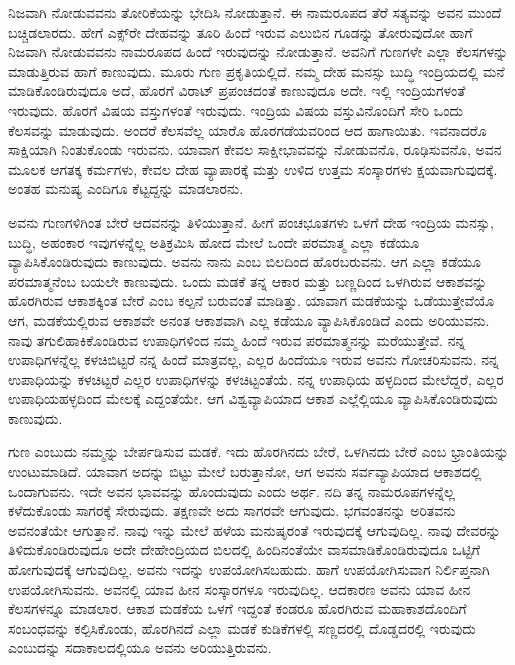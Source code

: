 ನಿಜವಾಗಿ ನೋಡುವವನು ತೋರಿಕೆಯನ್ನು ಭೇದಿಸಿ ನೋಡುತ್ತಾನೆ. ಈ ನಾಮರೂಪದ ತೆರೆ ಸತ್ಯವನ್ನು ಅವನ ಮುಂದೆ ಬಚ್ಚಿಡಲಾರದು. ಹೇಗೆ ಎಕ್ಸ್​ರೇ ದೇಹವನ್ನು ತೂರಿ ಹಿಂದೆ ಇರುವ ಎಲುಬಿನ ಗೂಡನ್ನು ತೋರುವುದೋ ಹಾಗೆ ನಿಜವಾಗಿ ನೋಡುವವನು ನಾಮರೂಪದ ಹಿಂದೆ ಇರುವುದನ್ನು ನೋಡುತ್ತಾನೆ. ಅವನಿಗೆ ಗುಣಗಳೇ ಎಲ್ಲಾ ಕೆಲಸಗಳನ್ನು ಮಾಡುತ್ತಿರುವ ಹಾಗೆ ಕಾಣುವುದು. ಮೂರು ಗುಣ ಪ್ರಕೃತಿಯಲ್ಲಿದೆ. ನಮ್ಮ ದೇಹ ಮನಸ್ಸು ಬುದ್ಧಿ ಇಂದ್ರಿಯದಲ್ಲಿ ಮನೆ ಮಾಡಿಕೊಂಡಿರುವುದೂ ಅದೆ, ಹೊರಗೆ ವಿರಾಟ್ ಪ್ರಪಂಚದಂತೆ ಕಾಣುವುದೂ ಅದೇ. ಇಲ್ಲಿ ಇಂದ್ರಿಯಗಳಂತೆ ಇರುವುದು. ಹೊರಗೆ ವಿಷಯ ವಸ್ತುಗಳಂತೆ ಇರುವುದು. ಇಂದ್ರಿಯ ವಿಷಯ ವಸ್ತುವಿನೊಂದಿಗೆ ಸೇರಿ ಒಂದು ಕೆಲಸವನ್ನು ಮಾಡುವುದು. ಅಂದರೆ ಕೆಲಸವೆಲ್ಲ ಯಾರೊ ಹೊರಗಡೆಯವರಿಂದ ಆದ ಹಾಗಾಯಿತು. ಇವನಾದರೊ ಸಾಕ್ಷಿಯಾಗಿ ನಿಂತುಕೊಂಡು ಇರುವನು. ಯಾವಾಗ ಕೇವಲ ಸಾಕ್ಷೀಭಾವವನ್ನು ನೋಡುವನೊ, ರೂಢಿಸುವನೊ, ಅವನ ಮೂಲಕ ಆಗತಕ್ಕ ಕರ್ಮಗಳು, ಕೇವಲ ದೇಹ ವ್ಯಾಪಾರಕ್ಕೆ ಮತ್ತು ಉಳಿದ ಉತ್ತಮ ಸಂಸ್ಕಾರಗಳು ಕ್ಷಯವಾಗುವುದಕ್ಕೆ. ಅಂತಹ ಮನುಷ್ಯ ಎಂದಿಗೂ ಕೆಟ್ಟದ್ದನ್ನು ಮಾಡಲಾರನು.

ಅವನು ಗುಣಗಳಿಗಿಂತ ಬೇರೆ ಆದವನನ್ನು ತಿಳಿಯುತ್ತಾನೆ. ಹೀಗೆ ಪಂಚಭೂತಗಳು ಒಳಗೆ ದೇಹ ಇಂದ್ರಿಯ ಮನಸ್ಸು, ಬುದ್ಧಿ, ಅಹಂಕಾರ ಇವುಗಳನ್ನೆಲ್ಲ ಅತಿಕ್ರಮಿಸಿ ಹೋದ ಮೇಲೆ ಒಂದೇ ಪರಮಾತ್ಮ ಎಲ್ಲಾ ಕಡೆಯೂ ವ್ಯಾಪಿಸಿಕೊಂಡಿರುವುದು ಕಾಣುವುದು. ಅವನು ನಾನು ಎಂಬ ಬಿಲದಿಂದ ಹೊರಬರುವನು. ಆಗ ಎಲ್ಲಾ ಕಡೆಯೂ ಪರಮಾತ್ಮನೆಂಬ ಬಯಲೇ ಕಾಣುವುದು. ಒಂದು ಮಡಕೆ ತನ್ನ ಆಕಾರ ಮತ್ತು ಬಣ್ಣದಿಂದ ಒಳಗಿರುವ ಆಕಾಶವನ್ನು ಹೊರಗಿರುವ ಆಕಾಶಕ್ಕಿಂತ ಬೇರೆ ಎಂಬ ಕಲ್ಪನೆ ಬರುವಂತೆ ಮಾಡಿತ್ತು. ಯಾವಾಗ ಮಡಕೆಯನ್ನು ಒಡೆಯುತ್ತೇವೆಯೊ ಆಗ, ಮಡಕೆಯಲ್ಲಿರುವ ಆಕಾಶವೇ ಅನಂತ ಆಕಾಶವಾಗಿ ಎಲ್ಲ ಕಡೆಯೂ ವ್ಯಾಪಿಸಿಕೊಂಡಿದೆ ಎಂದು ಅರಿಯುವನು. ನಾವು ತಗುಲಿಹಾಕಿಕೊಂಡಿರುವ ಉಪಾಧಿಗಳಿಂದ ನಮ್ಮ ಹಿಂದೆ ಇರುವ ಪರಮಾತ್ಮನನ್ನು ಮರೆಯುತ್ತೇವೆ. ನನ್ನ ಉಪಾಧಿಗಳನ್ನೆಲ್ಲ ಕಳಚಿಬಿಟ್ಟರೆ ನನ್ನ ಹಿಂದೆ ಮಾತ್ರವಲ್ಲ, ಎಲ್ಲರ ಹಿಂದೆಯೂ ಇರುವ ಅವನು ಗೋಚರಿಸುವನು. ನನ್ನ ಉಪಾಧಿಯನ್ನು ಕಳಚಿಟ್ಟರೆ ಎಲ್ಲರ ಉಪಾಧಿಗಳನ್ನು ಕಳಚಿಟ್ಟಂತೆಯೆ. ನನ್ನ ಉಪಾಧಿಯ ಹಳ್ಳದಿಂದ ಮೇಲೆದ್ದರೆ, ಎಲ್ಲರ ಉಪಾಧಿಯ\break ಹಳ್ಳದಿಂದ ಮೇಲಕ್ಕೆ ಎದ್ದಂತೆಯೇ. ಆಗ ವಿಶ್ವವ್ಯಾಪಿಯಾದ ಆಕಾಶ ಎಲ್ಲೆಲ್ಲಿಯೂ ವ್ಯಾಪಿಸಿ\-ಕೊಂಡಿರುವುದು ಕಾಣುವುದು.

ಗುಣ ಎಂಬುದು ನಮ್ಮನ್ನು ಬೇರ್ಪಡಿಸುವ ಮಡಕೆ. ಇದು ಹೊರಗಿನದು ಬೇರೆ, ಒಳಗಿನದು ಬೇರೆ ಎಂಬ ಭ್ರಾಂತಿಯನ್ನು ಉಂಟುಮಾಡಿದೆ. ಯಾವಾಗ ಅದನ್ನು ಬಿಟ್ಟು ಮೇಲೆ ಬರುತ್ತಾನೋ, ಆಗ ಅವನು ಸರ್ವವ್ಯಾಪಿಯಾದ ಆಕಾಶದಲ್ಲಿ ಒಂದಾಗುವನು. ಇದೇ ಅವನ ಭಾವವನ್ನು ಹೊಂದುವುದು ಎಂದು ಅರ್ಥ. ನದಿ ತನ್ನ ನಾಮರೂಪಗಳನ್ನೆಲ್ಲ ಕಳೆದುಕೊಂಡು ಸಾಗರಕ್ಕೆ ಸೇರುವುದು. ತಕ್ಷಣವೇ ಅದು ಸಾಗರವೇ ಆಗುವುದು. ಭಗವಂತನನ್ನು ಅರಿತವನು ಅವನಂತೆಯೇ ಆಗುತ್ತಾನೆ. ನಾವು ಇನ್ನು ಮೇಲೆ ಹಳೆಯ ಮನುಷೃರಂತೆ ಇರುವುದಕ್ಕೆ ಆಗುವುದಿಲ್ಲ. ನಾವು ದೇವರನ್ನು ತಿಳಿದುಕೊಂಡಿರುವುದೂ ಅದೇ ದೇಹೇಂದ್ರಿಯದ ಬಿಲದಲ್ಲಿ ಹಿಂದಿನಂತೆಯೇ ವಾಸ\-ಮಾಡಿಕೊಂಡಿರುವುದೂ ಒಟ್ಟಿಗೆ ಹೋಗುವುದಕ್ಕೆ ಆಗುವುದಿಲ್ಲ. ಅವನು ಇದನ್ನು ಉಪಯೋಗಿಸಬಹುದು. ಹಾಗೆ ಉಪಯೋಗಿಸುವಾಗ ನಿರ್ಲಿಪ್ತನಾಗಿ ಉಪಯೋಗಿಸುವನು. ಅವನಲ್ಲಿ ಯಾವ ಹೀನ ಸಂಸ್ಕಾರಗಳೂ ಇರುವುದಿಲ್ಲ. ಆದಕಾರಣ ಅವನು ಯಾವ ಹೀನ ಕೆಲಸಗಳನ್ನೂ ಮಾಡಲಾರ. ಆಕಾಶ ಮಡಕೆಯ ಒಳಗೆ ಇದ್ದಂತೆ ಕಂಡರೂ ಹೊರಗಿರುವ ಮಹಾಕಾಶದೊಂದಿಗೆ ಸಂಬಂಧವನ್ನು ಕಲ್ಪಿಸಿಕೊಂಡು, ಹೊರಗಿನದೆ ಎಲ್ಲಾ ಮಡಕೆ ಕುಡಿಕೆಗಳಲ್ಲಿ ಸಣ್ಣದರಲ್ಲಿ ದೊಡ್ಡದರಲ್ಲಿ ಇರುವುದು ಎಂಬುದನ್ನು ಸದಾಕಾಲದಲ್ಲಿಯೂ ಅವನು ಅರಿಯುತ್ತಿರುವನು.

